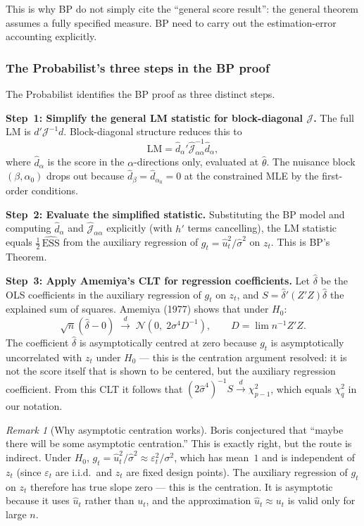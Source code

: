 \documentclass[a4paper,oneside,12pt]{extarticle}
\theoremstyle{plain}
\theoremstyle{definition}
\theoremstyle{remark}
\newtheorem{remark}[proposition]{Remark}
\begin{document}
This is why BP do not simply cite the ``general score result'': the
general theorem assumes a fully specified measure.  BP need to carry
out the estimation-error accounting explicitly.

\subsubsection*{The Probabilist's three steps in the BP proof}

The Probabilist identifies the BP proof as three distinct steps.

\textbf{Step~1: Simplify the general LM statistic for block-diagonal $\mathcal{J}$.}
The full LM is $d'\mathcal{J}^{-1}d$.  Block-diagonal structure reduces
this to
\[
  \text{LM} = \hat d_\alpha' \hat{\mathcal{J}}_{\alpha\alpha}^{-1} \hat d_\alpha,
\]
where $\hat d_\alpha$ is the score in the $\alpha$-directions only,
evaluated at $\hat\theta$.  The nuisance block $(\beta, \alpha_0)$
drops out because $\hat d_\beta = \hat d_{\alpha_0} = 0$ at the
constrained MLE by the first-order conditions.

\textbf{Step~2: Evaluate the simplified statistic.}
Substituting the BP model and computing $\hat d_\alpha$ and
$\hat{\mathcal{J}}_{\alpha\alpha}$ explicitly (with $h'$ terms
cancelling), the LM statistic equals $\frac{1}{2}\,\widehat{\mathrm{ESS}}$
from the auxiliary regression of $g_t = \hat u_t^2/\hat\sigma^2$ on
$z_t$.  This is BP's Theorem.

\textbf{Step~3: Apply Amemiya's CLT for regression coefficients.}
Let $\hat\delta$ be the OLS coefficients in the auxiliary regression
of $g_t$ on $z_t$, and $S = \hat\delta'(Z'Z)\hat\delta$ the explained
sum of squares.  Amemiya (1977) shows that under $H_0$:
\[
  \sqrt{n}(\hat\delta - 0) \;\xrightarrow{d}\; \mathcal{N}(0,\;2\sigma^4 D^{-1}),
  \qquad D = \lim n^{-1}Z'Z.
\]
The coefficient $\hat\delta$ is asymptotically centred at zero because
$g_t$ is asymptotically uncorrelated with $z_t$ under $H_0$ — this is
the centration argument resolved: it is not the score itself that is
shown to be centered, but the auxiliary regression coefficient.  From
this CLT it follows that $(2\hat\sigma^4)^{-1}S \xrightarrow{d}
\chi^2_{p-1}$, which equals $\chi^2_q$ in our notation.

\begin{remark}[Why asymptotic centration works]
Boris conjectured that ``maybe there will be some asymptotic
centration.''  This is exactly right, but the route is indirect.
Under $H_0$, $g_t = \hat u_t^2/\hat\sigma^2 \approx
\varepsilon_t^2/\sigma^2$, which has mean~$1$ and is independent of
$z_t$ (since $\varepsilon_t$ are i.i.d.\ and $z_t$ are fixed design
points).  The auxiliary regression of $g_t$ on $z_t$ therefore has
true slope zero — this is the centration.  It is asymptotic because
it uses $\hat u_t$ rather than $u_t$, and the approximation
$\hat u_t \approx u_t$ is valid only for large $n$.
\end{remark}
\end{document}
